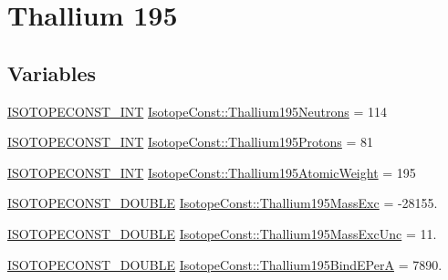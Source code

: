 \hypertarget{group___isotope_const-_thallium-_tl195}{}\section{Thallium 195}
\label{group___isotope_const-_thallium-_tl195}
\subsection*{Variables}
\begin{DoxyCompactItemize}
\item 
\mbox{\hyperlink{group___isotope_const-_macros_ga5f18360b3e99483a35c32d789e62621c}{I\+S\+O\+T\+O\+P\+E\+C\+O\+N\+S\+T\+\_\+\+I\+NT}} \mbox{\hyperlink{group___isotope_const-_thallium-_tl195_ga99dc57bbbe8e93b7950864f7dd159fee}{Isotope\+Const\+::\+Thallium195\+Neutrons}} = 114
\item 
\mbox{\hyperlink{group___isotope_const-_macros_ga5f18360b3e99483a35c32d789e62621c}{I\+S\+O\+T\+O\+P\+E\+C\+O\+N\+S\+T\+\_\+\+I\+NT}} \mbox{\hyperlink{group___isotope_const-_thallium-_tl195_ga5ab46bcc936ae91a13b570de5f4093ad}{Isotope\+Const\+::\+Thallium195\+Protons}} = 81
\item 
\mbox{\hyperlink{group___isotope_const-_macros_ga5f18360b3e99483a35c32d789e62621c}{I\+S\+O\+T\+O\+P\+E\+C\+O\+N\+S\+T\+\_\+\+I\+NT}} \mbox{\hyperlink{group___isotope_const-_thallium-_tl195_gace0bae17108bd5e1c99ef020d8d00184}{Isotope\+Const\+::\+Thallium195\+Atomic\+Weight}} = 195
\item 
\mbox{\hyperlink{group___isotope_const-_macros_ga8f45a7272ce02c0b4c65c44636ed719a}{I\+S\+O\+T\+O\+P\+E\+C\+O\+N\+S\+T\+\_\+\+D\+O\+U\+B\+LE}} \mbox{\hyperlink{group___isotope_const-_thallium-_tl195_gafe16fcfdbad38002ab0dd792dd683779}{Isotope\+Const\+::\+Thallium195\+Mass\+Exc}} = -\/28155.
\item 
\mbox{\hyperlink{group___isotope_const-_macros_ga8f45a7272ce02c0b4c65c44636ed719a}{I\+S\+O\+T\+O\+P\+E\+C\+O\+N\+S\+T\+\_\+\+D\+O\+U\+B\+LE}} \mbox{\hyperlink{group___isotope_const-_thallium-_tl195_ga4fd0b906cf7f1a956b3d22a9c398dfd9}{Isotope\+Const\+::\+Thallium195\+Mass\+Exc\+Unc}} = 11.
\item 
\mbox{\hyperlink{group___isotope_const-_macros_ga8f45a7272ce02c0b4c65c44636ed719a}{I\+S\+O\+T\+O\+P\+E\+C\+O\+N\+S\+T\+\_\+\+D\+O\+U\+B\+LE}} \mbox{\hyperlink{group___isotope_const-_thallium-_tl195_ga50580592cfc79bf2a565b79cda903a25}{Isotope\+Const\+::\+Thallium195\+Bind\+E\+PerA}} = 7890.
\item 

\end{DoxyCompactItemize}
